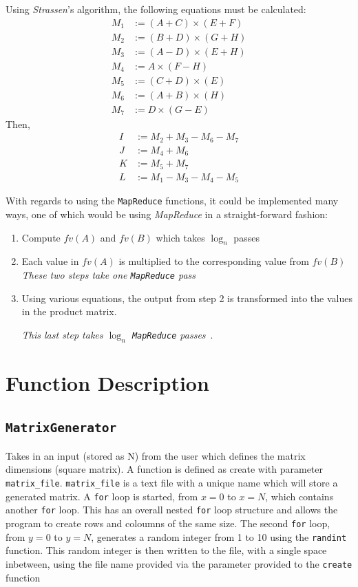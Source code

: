 \documentclass[10pt, conference]{IEEEtran}
\def\code#1{\texttt{#1}}
\begin{document}
Using \emph{Strassen}'s algorithm, the following equations must be calculated:
\begin{align*}
M_1&:= (A+C)\times (E +F)\\
M_2&:= (B+D) \times (G+H)\\
M_3&:=(A-D)\times (E+H)\\
M_4&:= A \times (F-H)\\
M_5&:= (C+D) \times (E)\\
M_6&:= (A+B) \times (H)\\
M_7&:= D \times (G-E)
\end{align*}
Then,
\begin{align*}
I&:=M_2+M_3-M_6-M_7\\
J&:=M_4+M_6\\
K&:=M_5 +M_7\\
L&:=M_1-M_3-M_4-M_5
\end{align*}

With regards to using the \code{MapReduce} functions, it could be implemented many ways, one of which would be using \emph{MapReduce} in a straight-forward fashion:
\begin{enumerate}
\item Compute $fv(A)$ and $fv(B)$ which takes $\log_n$ passes
\item Each value in $fv(A)$ is multiplied to the corresponding value from $fv(B)$\\

\emph{These two steps take one \code{MapReduce} pass}\\

\item Using various equations, the output from step 2 is transformed into the values in the product matrix.

\emph{This last step takes $\log_n$ \code{MapReduce} passes}~\cite{Conference}.
\end{enumerate}

\section{Function Description}
\label{Function Description}

\subsection{\code{MatrixGenerator}}
\label{MatrixGenerator}

Takes in an input (stored as N) from the user which defines the matrix dimensions (square matrix). A function is defined as create with parameter \code{matrix\_file}. \code{matrix\_file} is a text file with a unique name which will store a generated matrix.
A \code{for} loop is started, from $x = 0$ to $x = N$, which contains another \code{for} loop. This has an overall nested \code{for} loop structure and allows the program to create rows and coloumns of the same size. The second \code{for} loop, from $y = 0$ to $y = N$, generates a random integer from 1 to 10 using the \code{randint} function. This random integer is then written to the file, with a single space inbetween, using the file name provided via the parameter provided to the \code{create} function
\end{document}

